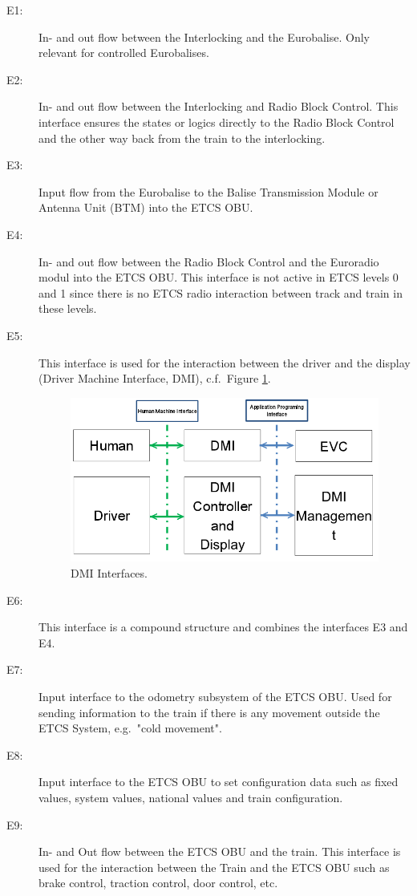 \begin{description}
\item[E1:] In- and out flow between the Interlocking and the Eurobalise. Only relevant for controlled Eurobalises.

\item[E2:] In- and out flow between the Interlocking and Radio Block Control.
This interface ensures the states or logics directly to the Radio Block Control and the other way back from the train to the interlocking.

\item[E3:] Input flow from the Eurobalise to the Balise Transmission Module or Antenna Unit (BTM) into the ETCS OBU.

\item[E4:] In- and out flow between the Radio Block Control and the Euroradio modul into the ETCS OBU. This interface is not active in ETCS levels 0 and 1 since there is no ETCS radio interaction between track and train in these levels.

\item[E5:] This interface is used for the interaction between the driver and the display (Driver Machine Interface, DMI), c.f.~Figure \ref{DMI Interfaces}.
\begin{figure}
\centering
\includegraphics[scale=0.5]{images/DMIinterfaces}
\caption{DMI Interfaces.}
\label{DMI Interfaces}
\end{figure}

\item[E6:] This interface is a compound structure and combines the interfaces E3 and E4.

\item[E7:] Input interface to the odometry subsystem of the ETCS OBU. Used for sending information to the train if there is any movement outside the ETCS System, e.g.~"cold movement".

\item[E8:] Input interface to the ETCS OBU to set configuration data such as fixed values, system values, national values and train configuration.

\item[E9:] In- and Out flow between the ETCS OBU and the train. This interface is used for the interaction between the Train and the ETCS OBU such as brake control, traction control, door control, etc.
\end{description}
